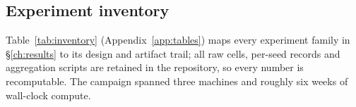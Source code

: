 \subsection{Experiment inventory}\label{sec:met-inventory}
Table~\ref{tab:inventory} (Appendix~\ref{app:tables}) maps every
experiment family in \S\ref{ch:results} to its design and artifact trail;
all raw cells, per-seed records and aggregation scripts are retained in the
repository, so every number is recomputable. The campaign spanned three
machines and roughly six weeks of wall-clock compute.
